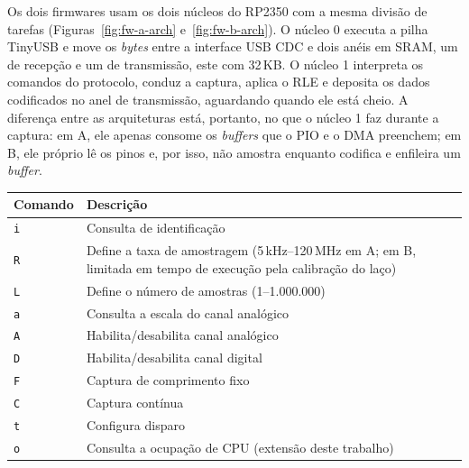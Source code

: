 Os dois firmwares usam os dois núcleos do RP2350 com a mesma divisão de
tarefas (Figuras~\ref{fig:fw-a-arch} e~\ref{fig:fw-b-arch}). O núcleo 0
executa a pilha TinyUSB e move os \emph{bytes} entre a interface \ac{USB}
\ac{CDC} e dois anéis em \ac{SRAM}, um de recepção e um de transmissão, este
com 32\,KB. O núcleo 1 interpreta os comandos do protocolo, conduz a captura,
aplica o \ac{RLE} e deposita os dados codificados no anel de transmissão,
aguardando quando ele está cheio. A diferença entre as arquiteturas está,
portanto, no que o núcleo 1 faz durante a captura: em A, ele apenas consome os
\emph{buffers} que o \ac{PIO} e o \ac{DMA} preenchem; em B, ele próprio lê os
pinos e, por isso, não amostra enquanto codifica e enfileira um
\emph{buffer}.

\begin{quadro}[H]
  \centering
  \caption{Comandos do protocolo sigrok-pico.}
  \label{qua:comandos}
  \small
  \begin{tabularx}{\linewidth}{|l|>{\raggedright\arraybackslash}X|}
    \hline
    \textbf{Comando} & \textbf{Descrição}                             \\ \hline
    \texttt{i}       & Consulta de identificação                      \\ \hline
    \texttt{R}       & Define a taxa de amostragem (5\,kHz--120\,MHz em A; em B, limitada em tempo de execução pela calibração do laço) \\ \hline
    \texttt{L}       & Define o número de amostras (1--1.000.000)     \\ \hline
    \texttt{a}       & Consulta a escala do canal analógico           \\ \hline
    \texttt{A}       & Habilita/desabilita canal analógico            \\ \hline
    \texttt{D}       & Habilita/desabilita canal digital              \\ \hline
    \texttt{F}       & Captura de comprimento fixo                    \\ \hline
    \texttt{C}       & Captura contínua                               \\ \hline
    \texttt{t}       & Configura disparo                              \\ \hline
    \texttt{o}       & Consulta a ocupação de \acs{CPU} (extensão deste trabalho) \\ \hline
  \end{tabularx}
\end{quadro}

